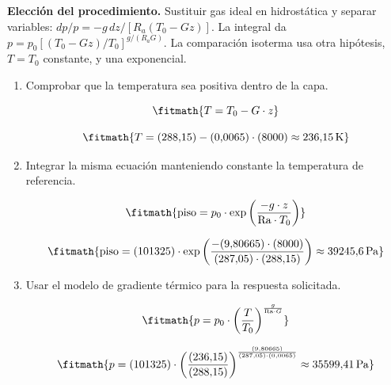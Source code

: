 \noindent\textbf{Elección del procedimiento.} Sustituir gas ideal en hidrostática y separar variables: $dp/p=-g\,dz/[R_a(T_0-Gz)]$. La integral da $p=p_0[(T_0-Gz)/T_0]^{g/(R_aG)}$. La comparación isoterma usa otra hipótesis, $T=T_0$ constante, y una exponencial.

\begin{enumerate}

\item Comprobar que la temperatura sea positiva dentro de la capa.

\[\fitmath{T=T_{0}-G\cdot z}\]

\[\fitmath{T=(288{,}15)-(0{,}0065)\cdot (8000)\approx 236{,}15\,\mathrm{K}}\]

\item Integrar la misma ecuación manteniendo constante la temperatura de referencia.

\[\fitmath{\mathrm{piso}=p_{0}\cdot \exp\left(\frac{-g\cdot z}{\mathrm{Ra}\cdot T_{0}}\right)}\]

\[\fitmath{\mathrm{piso}=(101325)\cdot \exp\left(\frac{-(9{,}80665)\cdot (8000)}{(287{,}05)\cdot (288{,}15)}\right)\approx 39245{,}6\,\mathrm{Pa}}\]

\item Usar el modelo de gradiente térmico para la respuesta solicitada.

\[\fitmath{p=p_{0}\cdot {\left(\frac{T}{T_{0}}\right)}^{\frac{g}{\mathrm{Ra}\cdot G}}}\]

\[\fitmath{p=(101325)\cdot {\left(\frac{(236{,}15)}{(288{,}15)}\right)}^{\frac{(9{,}80665)}{(287{,}05)\cdot (0{,}0065)}}\approx 35599{,}41\,\mathrm{Pa}}\]

\end{enumerate}
